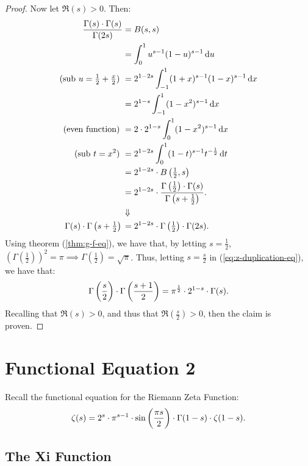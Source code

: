 \begin{proof}
Now let $\Re(s) > 0$. Then:
\begin{align}
    \frac{\Gamma(s) \cdot \Gamma(s)}{\Gamma(2s)} &= B(s,s) \nonumber \\
    &= \int_0^1 u^{s-1} (1-u)^{s-1} \dif u \nonumber \\
    \text{(sub $u = \tfrac{1}{2}+ \tfrac{x}{2}$) } &= 2^{1-2s} \int_{-1}^1 (1+x)^{s-1} (1-x)^{s-1} \dif x \nonumber \\
    &= 2^{1-s} \int_{-1}^1 (1-x^2)^{s-1} \dif x \nonumber \\
    \text{(even function) } &= 2 \cdot 2^{1-s} \int_{0}^1 (1-x^2)^{s-1} \dif x \nonumber \\
    \text{(sub $t = x^2$) } &= 2^{1-2s} \int_0^1 (1-t)^{s-1} t^{-\frac{1}{2}} \dif t \nonumber \\
    &= 2^{1-2s} \cdot B \br{\tfrac{1}{2}, s} \nonumber \\
    &= 2^{1-2s} \cdot \frac{\Gamma\br{\tfrac{1}{2}} \cdot \Gamma(s)}{\Gamma\br{s+\tfrac{1}{2}}}. \nonumber \\
    &\Downarrow \nonumber \\
    \Gamma(s) \cdot \Gamma\br{s+\tfrac{1}{2}} {} &= 2^{1-2s} \cdot \Gamma\br{\tfrac{1}{2}} \cdot  \Gamma(2s) \label{eq:z-duplication-eq}.
\end{align}
Using theorem (\ref{thm:g-f-eq}), we have that, by letting $s = \tfrac{1}{2}$, $(\Gamma(\tfrac{1}{2}))^2 = \pi \implies \Gamma(\tfrac{1}{2}) = \sqrt{\pi}$. Thus, letting $s= \frac{s}{2}$ in (\ref{eq:z-duplication-eq}), we have that:
\begin{align*}
    \Gamma\left( \frac{s}{2} \right) \cdot \Gamma\left( \frac{s+1}{2} \right) = \pi ^{\frac{1}{2}} \cdot 2^{1-s} \cdot \Gamma(s).
\end{align*}
Recalling that $\Re(s) > 0$, and thus that $\Re(\tfrac{s}{2}) > 0$, then the claim is proven.
\end{proof}





\section{Functional Equation 2}
Recall the functional equation for the Riemann Zeta Function:
\begin{align*}
    \zeta(s) = 2^s \cdot \pi^{s-1} \cdot \sin\left( \frac{\pi s}{2} \right) \cdot \Gamma(1-s) \cdot \zeta(1-s).
\end{align*}


\subsection{The Xi Function}

